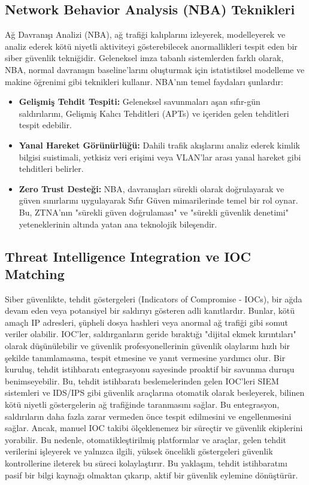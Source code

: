 \subsection{Network Behavior Analysis (NBA) Teknikleri}

Ağ Davranışı Analizi (NBA), ağ trafiği kalıplarını izleyerek, modelleyerek ve analiz ederek kötü niyetli aktiviteyi gösterebilecek anormallikleri tespit eden bir siber güvenlik tekniğidir. Geleneksel imza tabanlı sistemlerden farklı olarak, NBA, normal davranışın baseline'larını oluşturmak için istatistiksel modelleme ve makine öğrenimi gibi teknikleri kullanır.
NBA'nın temel faydaları şunlardır:

\begin{itemize}
\item \textbf{Gelişmiş Tehdit Tespiti:} Geleneksel savunmaları aşan sıfır-gün saldırılarını, Gelişmiş Kalıcı Tehditleri (APTs) ve içeriden gelen tehditleri tespit edebilir.
\item \textbf{Yanal Hareket Görünürlüğü:} Dahili trafik akışlarını analiz ederek kimlik bilgisi suistimali, yetkisiz veri erişimi veya VLAN'lar arası yanal hareket gibi tehditleri belirler.
\item \textbf{Zero Trust Desteği:} NBA, davranışları sürekli olarak doğrulayarak ve güven sınırlarını uygulayarak Sıfır Güven mimarilerinde temel bir rol oynar. Bu, ZTNA'nın "sürekli güven doğrulaması" ve "sürekli güvenlik denetimi" yeteneklerinin altında yatan ana teknolojik bileşendir.
\end{itemize}

\subsection{Threat Intelligence Integration ve IOC Matching}

Siber güvenlikte, tehdit göstergeleri (Indicators of Compromise - IOCs), bir ağda devam eden veya potansiyel bir saldırıyı gösteren adli kanıtlardır. Bunlar, kötü amaçlı IP adresleri, şüpheli dosya hashleri veya anormal ağ trafiği gibi somut veriler olabilir. IOC'ler, saldırganların geride bıraktığı "dijital ekmek kırıntıları" olarak düşünülebilir ve güvenlik profesyonellerinin güvenlik olaylarını hızlı bir şekilde tanımlamasına, tespit etmesine ve yanıt vermesine yardımcı olur.
Bir kuruluş, tehdit istihbaratı entegrasyonu sayesinde proaktif bir savunma duruşu benimseyebilir. Bu, tehdit istihbaratı beslemelerinden gelen IOC'leri SIEM sistemleri ve IDS/IPS gibi güvenlik araçlarına otomatik olarak besleyerek, bilinen kötü niyetli göstergelerin ağ trafiğinde taranmasını sağlar. Bu entegrasyon, saldırıların daha fazla zarar vermeden önce tespit edilmesini ve engellenmesini sağlar.
Ancak, manuel IOC takibi ölçeklenemez bir süreçtir ve güvenlik ekiplerini yorabilir. Bu nedenle, otomatikleştirilmiş platformlar ve araçlar, gelen tehdit verilerini işleyerek ve yalnızca ilgili, yüksek öncelikli göstergeleri güvenlik kontrollerine ileterek bu süreci kolaylaştırır. Bu yaklaşım, tehdit istihbaratını pasif bir bilgi kaynağı olmaktan çıkarıp, aktif bir güvenlik eylemine dönüştürür.

